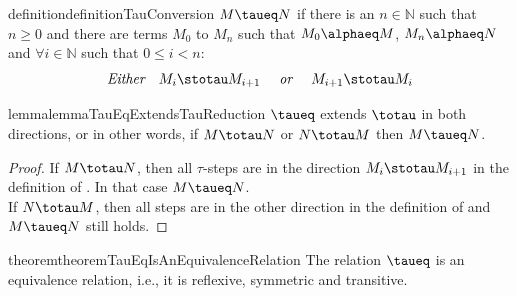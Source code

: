 \begin{reusable}{definition}{definitionTauConversion}
    $M \taueq N$ if there is an $n \in \mathbb{N}$ such that $n \geq 0$ and there are terms $M_{0}$ to $M_{n}$ such that $M_{0} \alphaeq M$, $M_{n} \alphaeq N$ and $\forall i \in \mathbb{N}$ such that $0 \leq i < n$:
\[
\textit{Either}\quad M_{i} \stotau M_{i+1}\quad\textit{ or }\quad M_{i+1} \stotau M_{i}
\]
\end{reusable}

\begin{reusable}{lemma}{lemmaTauEqExtendsTauReduction}
    $\taueq$ extends $\totau$ in both directions, or in other words, if $M \totau N$ or $N \totau M$ then $M \taueq N$.
\end{reusable}

\begin{proof}
If $M \totau N$, then all $\tau$-steps are in the direction $M_{i} \stotau M_{i+1}$ in the definition of \tauequivalence. In that case $M \taueq N$.\\
If $N \totau M$, then all steps are in the other direction in the definition of \tauequivalence and $M \taueq N$ still holds.
\end{proof}

\begin{reusableWithProof}{theorem}{theoremTauEqIsAnEquivalenceRelation}
    The relation $\taueq$ is an equivalence relation, i.e., it is reflexive, symmetric and transitive.
\end{reusableWithProof}
